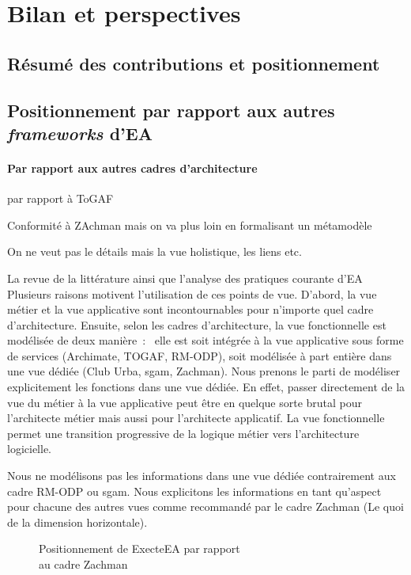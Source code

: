 \chapter{Bilan et perspectives}
\label{ch:bilan}

\PartialToc

\section{Résumé des contributions et positionnement}


\section{Positionnement par rapport aux autres \emph{frameworks} d'EA}

\subsubsection{Par rapport aux autres cadres d'architecture}
par rapport à ToGAF

Conformité à ZAchman mais on va plus loin en formalisant un métamodèle

On ne veut pas le détails mais la vue holistique, les liens etc.

La revue de la littérature ainsi que
l'analyse des pratiques courante d'EA Plusieurs raisons
motivent l'utilisation de ces points de vue. D'abord, la vue métier et la vue
applicative sont incontournables pour n'importe quel cadre d'architecture.
Ensuite, selon les cadres d'architecture, la vue fonctionnelle est modélisée de
deux manière~:~ elle est soit intégrée à la vue applicative sous forme de
services (Archimate, TOGAF, RM-ODP), soit modélisée à part entière dans une vue
dédiée (Club Urba, \gls{sgam}, Zachman). Nous prenons le parti de modéliser
explicitement les fonctions dans une vue dédiée. En effet, passer directement
de la vue du métier à la vue applicative peut être en quelque sorte brutal pour
l'architecte métier mais aussi pour l'architecte applicatif. La vue fonctionnelle
permet une transition progressive de la logique métier vers l'architecture
logicielle.

Nous ne modélisons pas les informations dans une vue dédiée contrairement aux
cadre RM-ODP ou \gls{sgam}. Nous explicitons les informations en tant qu'aspect
pour chacune des autres vues comme recommandé par le cadre Zachman (Le quoi de
la dimension horizontale).

\begin{figure}[!ht]
    \begin{center}
	
    \end{center}
	\caption{Positionnement de ExecteEA par rapport\\ au cadre Zachman}
	\label{fig:positionZachman}
\end{figure}


